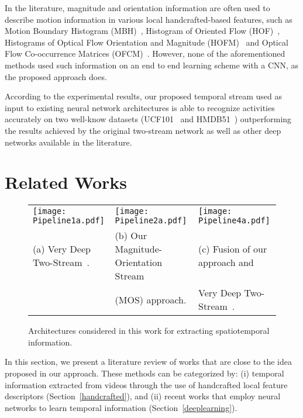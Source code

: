 \documentclass[10pt,conference]{IEEEtran}
\begin{document}
In the literature, magnitude and orientation information are often used to describe motion information  in various local  handcrafted-based features, such as Motion Boundary Histogram (MBH)~\cite{Dalal:2006}, Histogram of Oriented Flow (HOF)~\cite{Laptev:2008}, Histograms of Optical Flow Orientation and Magnitude (HOFM)~\cite{Colque:2015} and Optical Flow Co-occurrence Matrices (OFCM)~\cite{Caetano:2016}. However, none of the aforementioned methods used such information on an end to end learning scheme with a CNN, as the proposed approach does.


According to the experimental results, our proposed temporal stream used as input to existing neural network architectures is able to recognize activities accurately on two well-know datasets (UCF101~\cite{Soomro:2012} and HMDB51~\cite{Kuehne:2011}) outperforming the results achieved by the original two-stream network as well as other deep networks available in the literature.


\section{Related Works}\label{related}

\begin{figure*}[!t]
	\centering
	\begin{tabular}{>{\centering\arraybackslash}m{6cm} >{\centering\arraybackslash}m{6cm} >{\centering\arraybackslash}m{6cm}}
		\texttt{[image: Pipeline1a.pdf]} & \texttt{[image: Pipeline2a.pdf]} &	\texttt{[image: Pipeline4a.pdf]}\\
		\footnotesize{(a) Very Deep Two-Stream~\cite{Wang:2015}.} & \footnotesize{(b) Our Magnitude-Orientation Stream} & \footnotesize{(c) Fusion of our approach and}\\
		& \footnotesize{(MOS) approach.} & \footnotesize{Very Deep Two-Stream~\cite{Wang:2015}.}\\
	\end{tabular}
	\caption{Architectures considered in this work for extracting spatiotemporal information.}
	\label{img:pipeline}
\end{figure*}


In this section, we present a literature review of works that are close to the idea proposed in our approach. These methods can be categorized by: (i) temporal information extracted from videos through the use of handcrafted local feature descriptors (Section~\ref{handcrafted}), and (ii) recent works that employ neural networks to learn temporal information (Section~\ref{deeplearning}).
\end{document}

